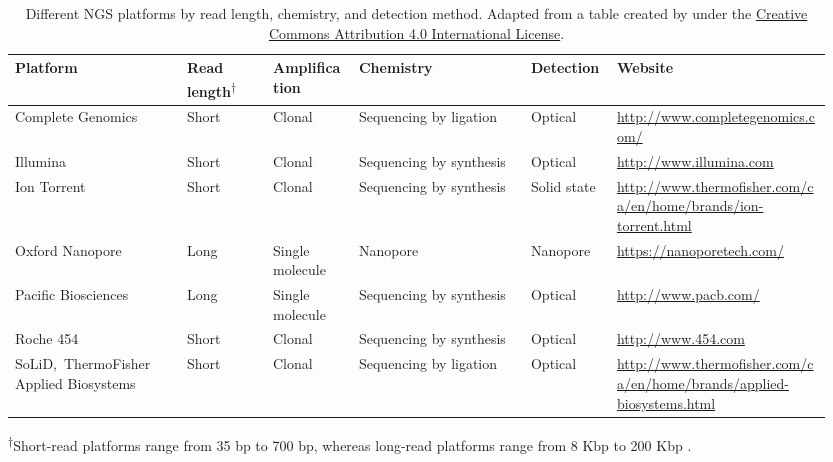 
\newpage
\begin{landscape}

\begin{longtable}{p{0.2\linewidth}|p{0.1\linewidth}p{0.1\linewidth}p{0.2\linewidth}p{0.1\linewidth}p{0.25\linewidth}}
\caption[Different NGS platforms by read length, chemistry, and detection method.]{Different NGS platforms by read length, chemistry, and detection method. Adapted from a table created by \cite{Levy2016} under the \href{https://creativecommons.org/licenses/by/4.0/}{Creative Commons Attribution 4.0 International License}.}
\label{tbl:ngs_platform_types}
    \\
    \hline
    Platform & Read length\textsuperscript{$\dagger$} & Amplification & Chemistry & Detection & Website
		\\
    \hline
		Complete Genomics & Short & Clonal & Sequencing by ligation & Optical & \href{http://www.completegenomics.com/}{http://www.completegenomics.com/}
		\\
		Illumina & Short & Clonal & Sequencing by synthesis & Optical & \href{http://www.illumina.com}{http://www.illumina.com}
		\\
		Ion Torrent & Short & Clonal & Sequencing by synthesis & Solid state & \href{http://www.thermofisher.com/ca/en/home/brands/ion-torrent.html}{http://www.thermofisher.com/ca/en/\hspace{3pt}home/brands/ion-torrent.html}
		\\
		Oxford Nanopore & Long & Single molecule & Nanopore & Nanopore & \href{https://nanoporetech.com/}{https://nanoporetech.com/}
		\\
		Pacific Biosciences & Long & Single molecule & Sequencing by synthesis & Optical & \href{http://www.pacb.com/}{http://www.pacb.com/}
		\\
		Roche 454 & Short & Clonal & Sequencing by synthesis & Optical & \href{http://www.454.com}{http://www.454.com}
		\\
		\hbox{SoLiD, ThermoFisher} \mbox{Applied} Biosystems & Short & Clonal & Sequencing by ligation & Optical & \href{http://www.thermofisher.com/ca/en/home/brands/applied-biosystems.html}{http://www.thermofisher.com/ca/en/\hspace{3pt}home/brands/applied-biosystems.html}
		\\
		\hline
\end{longtable}
\noindent\textsuperscript{$\dagger$}Short-read platforms range from 35 bp to 700 bp, whereas long-read platforms range from 8 Kbp to 200 Kbp \cite{Goodwin2016}.
\end{landscape}

